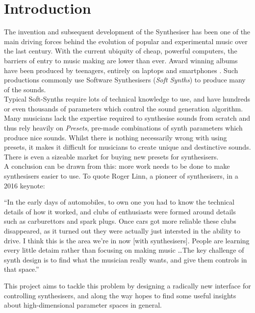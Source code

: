 \documentclass[11pt, oneside]{report}   	%
\begin{document}
\chapter{Introduction}
The invention and subsequent development of the Synthesiser has been one of the main driving forces behind the evolution of popular and experimental music over the last century. With the current ubiquity of cheap, powerful computers, the barriers of entry to music making are lower than ever. Award winning albums have been produced by teenagers, entirely on laptops and smartphones \cite{IphoneProducer}. Such productions commonly use Software Synthesisers (\emph{Soft Synths}) to produce many of the sounds.\\
Typical Soft-Synths require lots of technical knowledge to use, and have hundreds or even thousands of parameters which control the sound generation algorithm. Many musicians lack the expertise required to synthesise sounds from scratch and thus rely heavily on \emph{Presets}, pre-made combinations of synth parameters which produce nice sounds. Whilst there is nothing necessarily wrong with using presets, it makes it difficult for musicians to create unique and destinctive sounds. There is even a sizeable market for buying new presets for synthesisers.\\
A conclusion can be drawn from this: more work needs to be done to make synthesisers easier to use. To quote Roger Linn, a pioneer of synthesisers, in a 2016 keynote: \cite{LinnKeynote}
\begin{displayquote}
	``In the early days of automobiles, to own one you had to know the technical details of how it worked, and clubs of enthusiasts were formed around details such as carburettors and spark plugs. Once cars got more reliable these clubs disappeared, as it turned out they were actually just intersted in the ability to drive. I think this is the area we're in now [with synthesisers]. People are learning every little detaim rather than focusing on making music \dots The key challenge of synth design is to find what the musician really wants, and give them controls in that space.''
\end{displayquote}
This project aims to tackle this problem by designing a radically new interface for controlling synthesisers, and along the way hopes to find some useful insights about high-dimensional parameter spaces in general.
%
\end{document}
